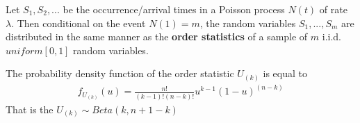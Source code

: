\documentclass[11pt]{elegantbook}
\begin{document}
\begin{corollary}
        Let $S_1,S_2,...$ be the occurrence/arrival times in a Poisson process $N(t)$ of rate $\lambda$. Then conditional on the event $N(1) = m$, the random variables $S_1,...,S_m$ are distributed in the same manner as the \textbf{order statistics} of a sample of $m$ i.i.d. $uniform [0, 1]$ random variables.
\end{corollary}
    The probability density function of the order statistic $U_{(k)}$ is equal to
    \begin{equation}
        \begin{aligned}
            f_{U_{(k)}}(u)=\frac{n!}{(k-1)!(n-k)!}u^{k-1}(1-u)^{(n-k)}
        \end{aligned}
        \nonumber
    \end{equation}
    That is the $U_{(k)}\sim Beta(k,n+1-k)$
\end{document}
